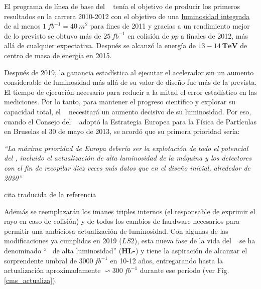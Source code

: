 El programa de línea de base del \LHC~ tenía el objetivo de producir los primeros resultados en la carrera 2010-2012 con el objetivo de una \href{https://es.wikipedia.org/wiki/Luminosidad}{luminosidad integrada} de al menos $1~fb^{-1} = 40~m^2$ para fines de 2011 y gracias a un rendimiento mejor de lo previsto se obtuvo más de $25~fb^{-1}$ en colisión de $pp$ a finales de 2012, más allá de cualquier expectativa. Después se alcanzó la energía de $13-14 ~ \textbf{TeV}$ de centro de masa de energía en 2015.

Después de 2019, la ganancia estadística al ejecutar el acelerador sin un aumento considerable de luminosidad más allá de su valor de diseño fue más de la prevista. El tiempo de ejecución necesario para reducir a la mitad el error estadístico en las mediciones. Por lo tanto, para mantener el progreso científico y explorar su capacidad total, el \LHC ~ necesitará un aumento decisivo de su luminosidad. Por eso, cuando el Consejo del \CERN ~ adoptó la Estrategia Europea para la Física de Partículas en Bruselas el 30 de mayo de 2013, se acordó que su primera prioridad sería:

\begin{minipage}{0.9\linewidth}
\vspace{5pt}%
{\small }
\textit{``La máxima prioridad de Europa debería ser la explotación de todo el potencial del \LHC, incluido el actualización de alta luminosidad de la máquina y los detectores con el fin de recopilar diez veces más datos que en el diseño inicial, alrededor de 2030''}
\begin{flushright}
cita traducida de la referencia \cite{wells_upgraded_2015}
\end{flushright}
\vspace{5pt}%
\end{minipage}

Además se reemplazarán los imanes triples internos (el responsable de exprimir el rayo en caso de colisión) y de todos los cambios de hardware necesarios para permitir una ambiciosa actualización de luminosidad. Con algunas de las modificaciones ya cumplidas en 2019 ($LS2$), esta nueva fase de la vida del \LHC ~ se ha denominado ``\LHC ~ de alta luminosidad'' (\textbf{HL-}\LHC) y tiene la aspiración de alcanzar el sorprendente umbral de $3000~fb^{-1}$ en 10-12 años, entregarando hasta la actualización aproximadamente $\backsim 300~fb^{-1}$ durante ese período (ver Fig. \ref{cms_actualiza}).


